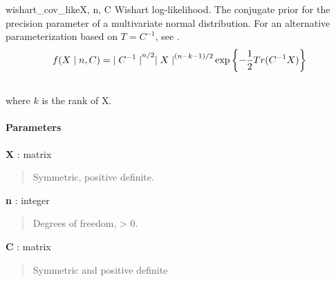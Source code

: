 \begin{funcdesc}{wishart\_cov\_like}{X, n, C}
\hypertarget{pymc.distributions.wishart_cov_like}{}
Wishart log-likelihood. The conjugate prior for the precision parameter of a multivariate normal distribution. For an alternative parameterization based on $T=C^{-1}$, see 
\hyperlink{pymc.distributions.wishart_like}{}.
\begin{gather}
\begin{split}f(X \mid n, C) = {\mid C^{-1} \mid}^{n/2}{\mid X \mid}^{(n-k-1)/2} \exp\left\{ -\frac{1}{2} Tr(C^{-1}X) \right\}\end{split}\notag\\\begin{split}\end{split}\notag
\end{gather}
where $k$ is the rank of X.
\paragraph{Parameters}\begin{paramlist}

\item[] \textbf{X} : matrix
\begin{quote}

Symmetric, positive definite.
\end{quote}

\item[] \textbf{n} : integer
\begin{quote}

Degrees of freedom, \textgreater{} 0.
\end{quote}

\item[] \textbf{C} : matrix
\begin{quote}

Symmetric and positive definite
\end{quote}
\end{paramlist}
\end{funcdesc}



